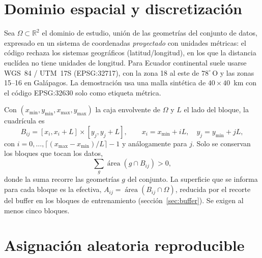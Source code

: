 \documentclass[11pt,a4paper]{article}
\begin{document}
\section{Dominio espacial y discretización}

Sea $\Omega\subset\mathbb R^2$ el dominio de estudio, unión de las geometrías del conjunto de datos,
expresado en un sistema de coordenadas \emph{proyectado} con unidades métricas: el código rechaza los
sistemas geográficos (latitud/longitud), en los que la distancia euclídea no tiene unidades de longitud.
Para Ecuador continental suele usarse WGS~84 / UTM~17S (EPSG:32717), con la zona 18 al este de
$78^\circ$\,O y las zonas 15--16 en Galápagos. La demostración usa una malla sintética de
$40\times40$~km con el código EPSG:32630 solo como etiqueta métrica.

Con $(x_{\min}, y_{\min}, x_{\max}, y_{\max})$ la caja envolvente de $\Omega$ y $L$ el lado del bloque,
la cuadrícula es
\begin{equation}
  B_{ij} = [x_i, x_i + L]\times[y_j, y_j + L],\qquad x_i = x_{\min} + iL,\quad y_j = y_{\min} + jL,
\end{equation}
con $i = 0,\dots,\lceil (x_{\max}-x_{\min})/L\rceil - 1$ y análogamente para $j$. Solo se conservan los
bloques que tocan los datos,
\begin{equation}
  \sum_{g}\operatorname{área}(g\cap B_{ij}) > 0,
\end{equation}
donde la suma recorre las geometrías $g$ del conjunto. La superficie que se informa para cada bloque es
la efectiva, $A_{ij} = \operatorname{área}(B_{ij}\cap\Omega)$, reducida por el recorte del buffer en los
bloques de entrenamiento (sección~\ref{sec:buffer}). Se exigen al menos cinco bloques.

\section{Asignación aleatoria reproducible}
\end{document}
